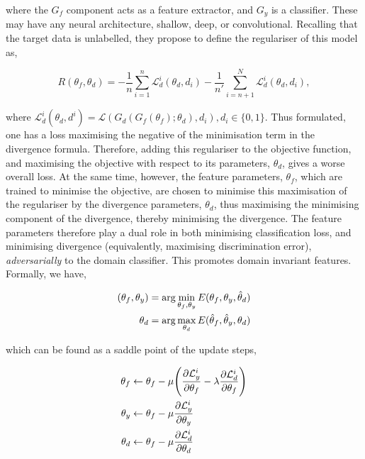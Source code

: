 where the $G_f$ component acts as a feature extractor, and $G_y$ is a classifier. These may have any neural architecture, shallow, deep, or convolutional. Recalling that the target data is unlabelled, they propose to define the regulariser of this model as,


\begin{equation}
R(\theta_f, \theta_d) = -\frac{1}{n}\sum_{i=1}^n\mathcal{L}_d^i(\theta_d, d_i) -\frac{1}{n'}\sum_{i=n+1}^N\mathcal{L}_d^i(\theta_d, d_i),
\end{equation}

where $\mathcal{L}_d^i(\theta_d, d^i) = \mathcal{L}(G_d(G_f(\theta_f) ; \theta_d), d_i), d_i \in \{0, 1\}$. Thus formulated, one has a loss maximising the negative of the minimisation term in the divergence formula. Therefore, adding this regulariser to the objective function, and maximising the objective with respect to its parameters, $\theta_d$, gives a worse overall loss. At the same time, however, the feature parameters, $\theta_f$, which are trained to minimise the objective, are chosen to minimise this maximisation of the regulariser by the divergence parameters, $\theta_d$, thus maximising the minimising component of the divergence, thereby minimising the divergence. The feature parameters therefore play a dual role in both minimising classification loss, and minimising divergence (equivalently, maximising discrimination error), \emph{adversarially} to the domain classifier. This promotes domain invariant features. Formally, we have,

\begin{align}
(\theta_f, \theta_y) &= \arg\min_{\theta_f, \theta_y} E(\theta_f, \theta_y, \hat{\theta}_d) \notag \\
\theta_d &= \arg\max_{\theta_d} E(\hat{\theta}_f, \hat{\theta}_y, \theta_d)
\end{align}

which can be found as a saddle point of the update steps,

\begin{align}
\theta_f &\leftarrow \theta_f - \mu\Bigg(\frac{\partial \mathcal{L}_y^i}{\partial\theta_f} - \lambda\frac{\partial \mathcal{L}_d^i}{\partial\theta_f}\Bigg) \notag \\
\theta_y &\leftarrow \theta_f - \mu\frac{\partial \mathcal{L}_y^i}{\partial\theta_y} \notag \\
\theta_d &\leftarrow \theta_f - \mu\frac{\partial \mathcal{L}_d^i}{\partial\theta_d}
\end{align}

